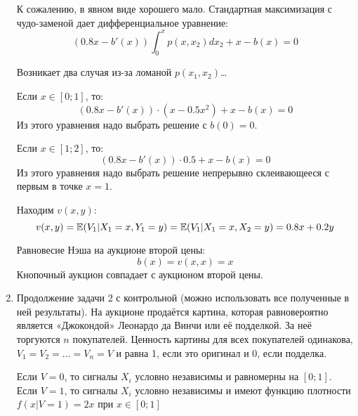 \begin{enumerate}


К сожалению, в явном виде хорошего мало. Стандартная максимизация с чудо-заменой дает дифференциальное уравнение:
\begin{equation}
(0.8x-b'(x))\int_{0}^{x}p(x,x_{2})dx_{2}+x-b(x)=0
\end{equation}

Возникает два случая из-за ломаной $ p(x_{1},x_{2}) $\ldots 

Если $ x\in [0;1] $, то:
\begin{equation}
(0.8x-b'(x))\cdot (x-0.5x^{2})+x-b(x)=0
\end{equation}
Из этого уравнения надо выбрать решение с $ b(0)=0 $.

Если $ x\in [1;2] $, то:
\begin{equation}
(0.8x-b'(x))\cdot 0.5+x-b(x)=0
\end{equation}
Из этого уравнения надо выбрать решение непрерывно склеивающееся с первым в точке $x=1$.


Находим $ v(x,y) $:
\begin{equation}
v(x,y)=\mathbb{E}(V_{1}|X_{1}=x,Y_{1}=y)=\mathbb{E}(V_{1}|X_{1}=x,X_{2}=y)=0.8x+0.2y
\end{equation}

Равновесие Нэша на аукционе второй цены:
\begin{equation}
b(x)=v(x,x)=x
\end{equation}
Кнопочный аукцион совпадает с аукционом второй цены. 


\item Продолжение задачи 2 с контрольной (можно использовать все полученные в ней результаты).
На аукционе продаётся картина, которая равновероятно является «Джокондой» Леонардо да Винчи или её подделкой. За неё торгуются $ n $ покупателей. Ценность картины для всех покупателей одинакова, $ V_{1}=V_{2}=\ldots =V_{n}=V $ и равна 1, если это оригинал и 0, если подделка.

Если $ V=0 $, то сигналы $ X_{i} $ условно независимы и равномерны на $ [0;1] $. Если $ V=1 $, то сигналы $ X_{i} $ условно независимы и имеют функцию плотности $ f(x|V=1)=2x $ при  $x\in [0;1] $


\end{enumerate}
